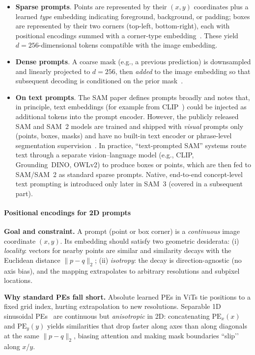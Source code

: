 \begin{enrichment}
\begin{enrichment}
		\begin{itemize}
			\item \textbf{Sparse prompts}. Points are represented by their $(x,y)$ coordinates plus a learned \emph{type} embedding indicating foreground, background, or padding; boxes are represented by their two corners (top-left, bottom-right), each with positional encodings summed with a corner-type embedding~\cite{kirillov2023_sam}. These yield $d{=}256$-dimensional tokens compatible with the image embedding.
			\item \textbf{Dense prompts}. A coarse mask (e.g., a previous prediction) is downsampled and linearly projected to $d{=}256$, then \emph{added} to the image embedding so that subsequent decoding is conditioned on the prior mask~\cite{kirillov2023_sam}.
			\item \textbf{On text prompts}. The SAM paper defines prompts broadly and notes that, in principle, text embeddings (for example from CLIP~\cite{radford2021_clip}) could be injected as additional tokens into the prompt encoder. However, the publicly released SAM and SAM~2 models are trained and shipped with \emph{visual} prompts only (points, boxes, masks) and have no built-in text encoder or phrase-level segmentation supervision~\cite{kirillov2023_sam,ravi2024_sam2}. In practice, “text-prompted SAM” systems route text through a separate vision--language model (e.g., CLIP, Grounding~DINO, OWLv2) to produce boxes or points, which are then fed to SAM/SAM~2 as standard sparse prompts. Native, end-to-end concept-level text prompting is introduced only later in SAM~3 (covered in a subsequent part).
		\end{itemize}
		
		\newpage
		
		\paragraph{Positional encodings for 2D prompts}
		\label{enr:par_chapter15_sam_posenc}
		
		\noindent\textbf{Goal and constraint.} A prompt (point or box corner) is a \emph{continuous} image coordinate \((x,y)\). Its embedding should satisfy two geometric desiderata: (i) \emph{locality}: vectors for nearby points are similar and similarity decays with the Euclidean distance \(\|p-q\|_2\); (ii) \emph{isotropy}: the decay is direction-agnostic (no axis bias), and the mapping extrapolates to arbitrary resolutions and subpixel locations.
		
		\noindent\textbf{Why standard PEs fall short.} Absolute learned PEs in ViTs tie positions to a fixed grid index, hurting extrapolation to new resolutions. Separable 1D sinusoidal PEs~\cite{vaswani2017_attention} are continuous but \emph{anisotropic} in 2D: concatenating \(\mathrm{PE}_x(x)\) and \(\mathrm{PE}_y(y)\) yields similarities that drop faster along axes than along diagonals at the same \(\|p-q\|_2\), biasing attention and making mask boundaries “slip’’ along \(x\)/\(y\).
		

\end{enrichment}
\end{enrichment}
